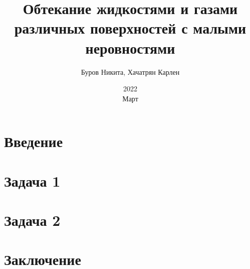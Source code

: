 \documentclass[12pt]{report}
\title{Обтекание жидкостями и газами различных поверхностей с малыми неровностями}
\author{Буров Никита, Хачатрян Карлен}
\date{ 2022 \\ Март}
\begin{document}
\maketitle

\chapter*{Введение}

\chapter*{Задача 1}

\chapter*{Задача 2}

\chapter*{Заключение}

\end{document}

